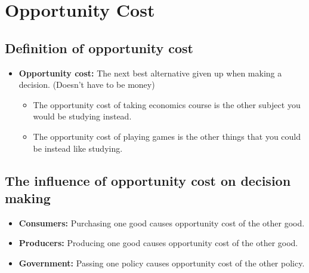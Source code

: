 \documentclass[11pt, a4paper, openany]{book}
\begin{document}
%

\section{Opportunity Cost}

\subsection{Definition of opportunity cost}

\begin{itemize}\itemsep0em
    \item \textbf{Opportunity cost:} The next best alternative given up when making a decision. (Doesn't have to be money)
        \begin{itemize}\itemsep0em
            \item The opportunity cost of taking economics course is the other subject you would be studying instead.
            \item The opportunity cost of playing games is the other things that you could be instead like studying.
        \end{itemize}
\end{itemize}

\subsection{The influence of opportunity cost on decision making}

\begin{itemize}\itemsep0em
    \item \textbf{Consumers:} Purchasing one good causes opportunity cost of the other good.
    \item \textbf{Producers:} Producing one good causes opportunity cost of the other good.
    \item \textbf{Government:} Passing one policy causes opportunity cost of the other policy.
\end{itemize}
\newpage
\end{document}
